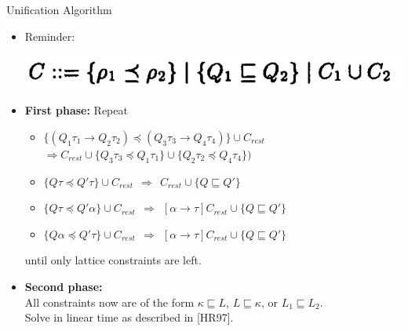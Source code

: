 \documentclass{beamer}
\begin{document}
\begin{frame}{Unification Algorithm}
\begin{itemize}

\item Reminder:
\begin{center}
\includegraphics[scale=0.65]{paper_constraint_grammar_qualifs.png}
\end{center}


\item \textbf{First phase:} Repeat
\begin{itemize}
\item $\{(Q_1\tau_1 \rightarrow Q_2\tau_2) \preceq (Q_3\tau_3 \rightarrow Q_4\tau_4)\} \cup C_{rest}$ \\
$\Rightarrow C_{rest} \cup \{Q_3\tau_3 \preceq Q_1\tau_1\} \cup \{ Q_2\tau_2 \preceq Q_4\tau_4\})$
\item $\{Q\tau \preceq Q'\tau\} \cup C_{rest} ~~\Rightarrow~~ C_{rest} \cup \{ Q \sqsubseteq Q'\}$
\item $\{Q\tau \preceq Q'\alpha\} \cup C_{rest} ~~\Rightarrow~~ [\alpha \rightarrow \tau]C_{rest} \cup \{Q \sqsubseteq Q'\}$
\item $\{Q\alpha \preceq Q'\tau\} \cup C_{rest} ~~\Rightarrow~~ [\alpha \rightarrow \tau]C_{rest} \cup \{Q \sqsubseteq Q'\}$
\end{itemize}
until only lattice constraints are left.

\item \textbf{Second phase:}\\
All constraints now are of the form $\kappa \sqsubseteq L$, $L \sqsubseteq \kappa$, or $L_1 \sqsubseteq L_2$.\\
Solve in linear time as described in [HR97].

\end{itemize}
\end{frame}
\end{document}
